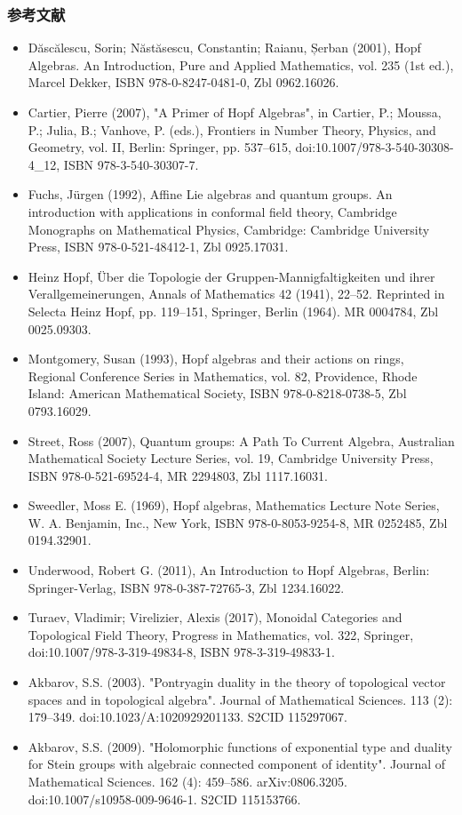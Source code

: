 \subsubsection{参考文献}
\begin{itemize}
\item Dăscălescu, Sorin; Năstăsescu, Constantin; Raianu, Șerban (2001), Hopf Algebras. An Introduction, Pure and Applied Mathematics, vol. 235 (1st ed.), Marcel Dekker, ISBN 978-0-8247-0481-0, Zbl 0962.16026.
\item Cartier, Pierre (2007), "A Primer of Hopf Algebras", in Cartier, P.; Moussa, P.; Julia, B.; Vanhove, P. (eds.), Frontiers in Number Theory, Physics, and Geometry, vol. II, Berlin: Springer, pp. 537–615, doi:10.1007/978-3-540-30308-4\_12, ISBN 978-3-540-30307-7.
\item Fuchs, Jürgen (1992), Affine Lie algebras and quantum groups. An introduction with applications in conformal field theory, Cambridge Monographs on Mathematical Physics, Cambridge: Cambridge University Press, ISBN 978-0-521-48412-1, Zbl 0925.17031.
\item Heinz Hopf, Über die Topologie der Gruppen-Mannigfaltigkeiten und ihrer Verallgemeinerungen, Annals of Mathematics 42 (1941), 22–52. Reprinted in Selecta Heinz Hopf, pp. 119–151, Springer, Berlin (1964). MR 0004784, Zbl 0025.09303.
\item Montgomery, Susan (1993), Hopf algebras and their actions on rings, Regional Conference Series in Mathematics, vol. 82, Providence, Rhode Island: American Mathematical Society, ISBN 978-0-8218-0738-5, Zbl 0793.16029.
\item Street, Ross (2007), Quantum groups: A Path To Current Algebra, Australian Mathematical Society Lecture Series, vol. 19, Cambridge University Press, ISBN 978-0-521-69524-4, MR 2294803, Zbl 1117.16031.
\item Sweedler, Moss E. (1969), Hopf algebras, Mathematics Lecture Note Series, W. A. Benjamin, Inc., New York, ISBN 978-0-8053-9254-8, MR 0252485, Zbl 0194.32901.
\item Underwood, Robert G. (2011), An Introduction to Hopf Algebras, Berlin: Springer-Verlag, ISBN 978-0-387-72765-3, Zbl 1234.16022.
\item Turaev, Vladimir; Virelizier, Alexis (2017), Monoidal Categories and Topological Field Theory, Progress in Mathematics, vol. 322, Springer, doi:10.1007/978-3-319-49834-8, ISBN 978-3-319-49833-1.
\item Akbarov, S.S. (2003). "Pontryagin duality in the theory of topological vector spaces and in topological algebra". Journal of Mathematical Sciences. 113 (2): 179–349. doi:10.1023/A:1020929201133. S2CID 115297067.
\item Akbarov, S.S. (2009). "Holomorphic functions of exponential type and duality for Stein groups with algebraic connected component of identity". Journal of Mathematical Sciences. 162 (4): 459–586. arXiv:0806.3205. doi:10.1007/s10958-009-9646-1. S2CID 115153766.
\end{itemize}
